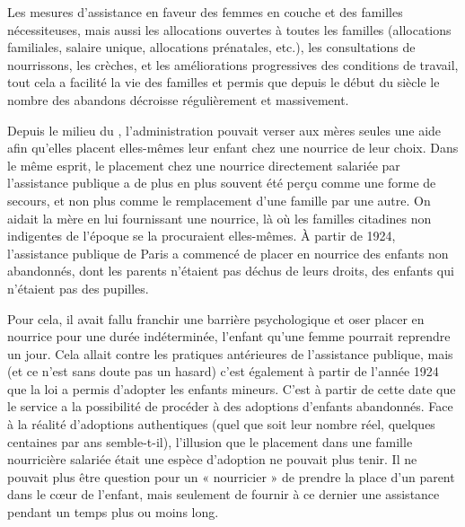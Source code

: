  Les mesures d'assistance en faveur des femmes en couche et des familles nécessiteuses, mais aussi les allocations ouvertes à toutes les familles (allocations familiales, salaire unique, allocations prénatales, etc.), les consultations de nourrissons, les crèches, et les améliorations progressives des conditions de travail, tout cela a facilité la vie des familles et permis que depuis le début du siècle le nombre des abandons décroisse régulièrement et massivement.

 Depuis le milieu du , l'administration pouvait verser aux mères seules une aide afin qu'elles placent elles-mêmes leur enfant chez une nourrice de leur choix. Dans le même esprit, le placement chez une nourrice directement salariée par l'assistance publique a de plus en plus souvent été perçu comme une forme de secours, et non plus comme le remplacement d'une famille par une autre. On aidait la mère en lui fournissant une nourrice, là où les familles citadines non indigentes de l'époque se la procuraient elles-mêmes. À partir de 1924, l'assistance publique de Paris a commencé de placer en nourrice des enfants non abandonnés, dont les parents n'étaient pas déchus de leurs droits, des enfants qui n'étaient pas des pupilles. 

 Pour cela, il avait fallu franchir une barrière psychologique et oser placer en nourrice pour une durée indéterminée, l'enfant qu'une femme pourrait reprendre un jour. Cela allait contre les pratiques antérieures de l'assistance publique, mais (et ce n'est sans doute pas un hasard) c'est également à partir de l'année 1924 que la loi a permis d'adopter les enfants mineurs. C'est à partir de cette date que le service a la possibilité de procéder à des adoptions d'enfants abandonnés. Face à la réalité d'adoptions authentiques (quel que soit leur nombre réel, quelques centaines par ans semble-t-il), l'illusion que le placement dans une famille nourricière salariée était une espèce d'adoption ne pouvait plus tenir. Il ne pouvait plus être question pour un « nourricier » de prendre la place d'un parent dans le cœur de l'enfant, mais seulement de fournir à ce dernier une assistance pendant un temps plus ou moins long. 

